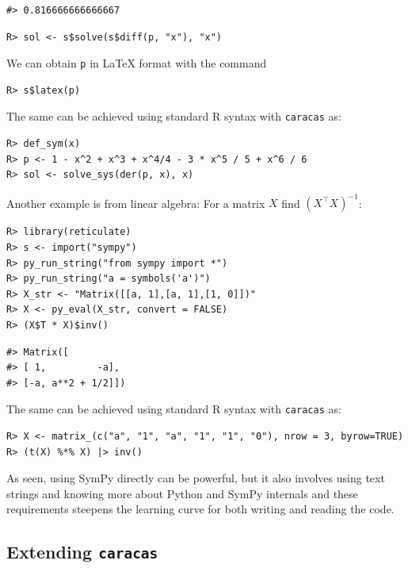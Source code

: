 \begin{verbatim}
#> 0.816666666666667
\end{verbatim}

\begin{verbatim}
R> sol <- s$solve(s$diff(p, "x"), "x")
\end{verbatim}

We can obtain \texttt{p} in LaTeX format with the command

\begin{verbatim}
R> s$latex(p)
\end{verbatim}

The same can be achieved using standard R syntax with \texttt{caracas} as:

\begin{verbatim}
R> def_sym(x)
R> p <- 1 - x^2 + x^3 + x^4/4 - 3 * x^5 / 5 + x^6 / 6
R> sol <- solve_sys(der(p, x), x)
\end{verbatim}

Another example is from linear algebra: For a matrix \(X\) find \((X^\top X)^{-1}\):

\begin{verbatim}
R> library(reticulate)
R> s <- import("sympy") 
R> py_run_string("from sympy import *")
R> py_run_string("a = symbols('a')")
R> X_str <- "Matrix([[a, 1],[a, 1],[1, 0]])"
R> X <- py_eval(X_str, convert = FALSE) 
R> (X$T * X)$inv()
\end{verbatim}

\begin{verbatim}
#> Matrix([
#> [ 1,         -a],
#> [-a, a**2 + 1/2]])
\end{verbatim}

The same can be achieved using standard R syntax with \texttt{caracas} as:

\begin{verbatim}
R> X <- matrix_(c("a", "1", "a", "1", "1", "0"), nrow = 3, byrow=TRUE)
R> (t(X) %*% X) |> inv() 
\end{verbatim}

As seen, using SymPy directly can be powerful, but it also involves
using text strings and knowing more about Python and SymPy internals
and these requirements steepens the learning curve for both writing
and reading the code.

\hypertarget{extending-caracas}{%
\subsection{\texorpdfstring{Extending \texttt{caracas}}{Extending caracas}}\label{extending-caracas}}

